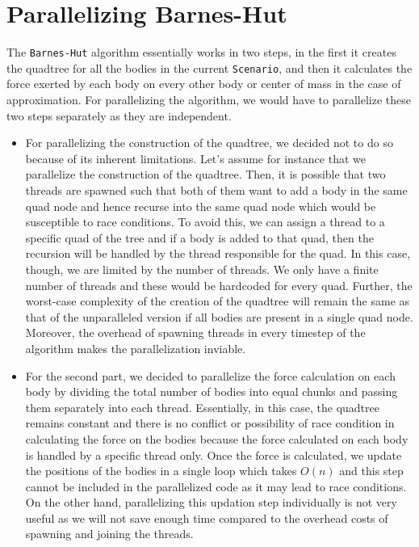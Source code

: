 \documentclass[12pt]{article}
\begin{document}
\section{Parallelizing Barnes-Hut}

The \verb|Barnes-Hut| algorithm essentially works in two steps, in the first it creates the quadtree for all the bodies in the current \verb|Scenario|, and then it calculates the force exerted by each body on every other body or center of mass in the case of approximation. For parallelizing the algorithm, we would have to parallelize these two steps separately as they are independent. 
\begin{itemize}
    \item For parallelizing the construction of the quadtree, we decided not to do so because of its inherent limitations. Let's assume for instance that we parallelize the construction of the quadtree. Then, it is possible that two threads are spawned such that both of them want to add a body in the same quad node and hence recurse into the same quad node which would be susceptible to race conditions. To avoid this, we can assign a thread to a specific quad of the tree and if a body is added to that quad, then the recursion will be handled by the thread responsible for the quad. In this case, though, we are limited by the number of threads. We only have a finite number of threads and these would be hardcoded for every quad. Further, the worst-case complexity of the creation of the quadtree will remain the same as that of the unparalleled version if all bodies are present in a single quad node. Moreover, the overhead of spawning threads in every timestep of the algorithm makes the parallelization inviable.
    \item For the second part, we decided to parallelize the force calculation on each body by dividing the total number of bodies into equal chunks and passing them separately into each thread. Essentially, in this case, the quadtree remains constant and there is no conflict or possibility of race condition in calculating the force on the bodies because the force calculated on each body is handled by a specific thread only. Once the force is calculated, we update the positions of the bodies in a single loop which takes $O(n)$ and this step cannot be included in the parallelized code as it may lead to race conditions. On the other hand, parallelizing this updation step individually is not very useful as we will not save enough time compared to the overhead costs of spawning and joining the threads.
\end{itemize}
\end{document}
